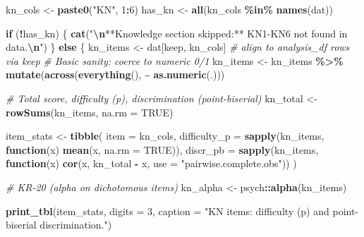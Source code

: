 \documentclass[
  10pt,
]{article}
\newenvironment{Shaded}{\begin{snugshade}}{\end{snugshade}}
\newcommand{\AttributeTok}[1]{\textcolor[rgb]{0.13,0.29,0.53}{#1}}
\newcommand{\CommentTok}[1]{\textcolor[rgb]{0.56,0.35,0.01}{\textit{#1}}}
\newcommand{\ConstantTok}[1]{\textcolor[rgb]{0.56,0.35,0.01}{#1}}
\newcommand{\ControlFlowTok}[1]{\textcolor[rgb]{0.13,0.29,0.53}{\textbf{#1}}}
\newcommand{\DecValTok}[1]{\textcolor[rgb]{0.00,0.00,0.81}{#1}}
\newcommand{\FunctionTok}[1]{\textcolor[rgb]{0.13,0.29,0.53}{\textbf{#1}}}
\newcommand{\NormalTok}[1]{#1}
\newcommand{\OtherTok}[1]{\textcolor[rgb]{0.56,0.35,0.01}{#1}}
\newcommand{\SpecialCharTok}[1]{\textcolor[rgb]{0.81,0.36,0.00}{\textbf{#1}}}
\newcommand{\StringTok}[1]{\textcolor[rgb]{0.31,0.60,0.02}{#1}}
\begin{document}
\begin{Shaded}
\begin{Highlighting}[]
\NormalTok{kn\_cols }\OtherTok{\textless{}{-}} \FunctionTok{paste0}\NormalTok{(}\StringTok{"KN"}\NormalTok{, }\DecValTok{1}\SpecialCharTok{:}\DecValTok{6}\NormalTok{)}
\NormalTok{has\_kn  }\OtherTok{\textless{}{-}} \FunctionTok{all}\NormalTok{(kn\_cols }\SpecialCharTok{\%in\%} \FunctionTok{names}\NormalTok{(dat))}

\ControlFlowTok{if}\NormalTok{ (}\SpecialCharTok{!}\NormalTok{has\_kn) \{}
  \FunctionTok{cat}\NormalTok{(}\StringTok{"}\SpecialCharTok{\textbackslash{}n}\StringTok{**Knowledge section skipped:** KN1{-}KN6 not found in data.}\SpecialCharTok{\textbackslash{}n}\StringTok{"}\NormalTok{)}
\NormalTok{\} }\ControlFlowTok{else}\NormalTok{ \{}
\NormalTok{  kn\_items }\OtherTok{\textless{}{-}}\NormalTok{ dat[keep, kn\_cols]  }\CommentTok{\# align to analysis\_df rows via \textquotesingle{}keep\textquotesingle{}}
  \CommentTok{\# Basic sanity: coerce to numeric 0/1}
\NormalTok{  kn\_items }\OtherTok{\textless{}{-}}\NormalTok{ kn\_items }\SpecialCharTok{\%\textgreater{}\%} \FunctionTok{mutate}\NormalTok{(}\FunctionTok{across}\NormalTok{(}\FunctionTok{everything}\NormalTok{(), }\SpecialCharTok{\textasciitilde{}} \FunctionTok{as.numeric}\NormalTok{(.)))}

  \CommentTok{\# Total score, difficulty (p), discrimination (point{-}biserial)}
\NormalTok{  kn\_total }\OtherTok{\textless{}{-}} \FunctionTok{rowSums}\NormalTok{(kn\_items, }\AttributeTok{na.rm =} \ConstantTok{TRUE}\NormalTok{)}

\NormalTok{  item\_stats }\OtherTok{\textless{}{-}} \FunctionTok{tibble}\NormalTok{(}
    \AttributeTok{item =}\NormalTok{ kn\_cols,}
    \AttributeTok{difficulty\_p =} \FunctionTok{sapply}\NormalTok{(kn\_items, }\ControlFlowTok{function}\NormalTok{(x) }\FunctionTok{mean}\NormalTok{(x, }\AttributeTok{na.rm =} \ConstantTok{TRUE}\NormalTok{)),}
    \AttributeTok{discr\_pb =} \FunctionTok{sapply}\NormalTok{(kn\_items, }\ControlFlowTok{function}\NormalTok{(x) }\FunctionTok{cor}\NormalTok{(x, kn\_total }\SpecialCharTok{{-}}\NormalTok{ x, }\AttributeTok{use =} \StringTok{"pairwise.complete.obs"}\NormalTok{))}
\NormalTok{  )}

  \CommentTok{\# KR{-}20 (alpha on dichotomous items)}
\NormalTok{  kn\_alpha }\OtherTok{\textless{}{-}}\NormalTok{ psych}\SpecialCharTok{::}\FunctionTok{alpha}\NormalTok{(kn\_items)}

  \FunctionTok{print\_tbl}\NormalTok{(item\_stats, }\AttributeTok{digits =} \DecValTok{3}\NormalTok{, }\AttributeTok{caption =} \StringTok{"KN items: difficulty (p) and point{-}biserial discrimination."}\NormalTok{)}


\end{Highlighting}
\end{Shaded}
\end{document}
